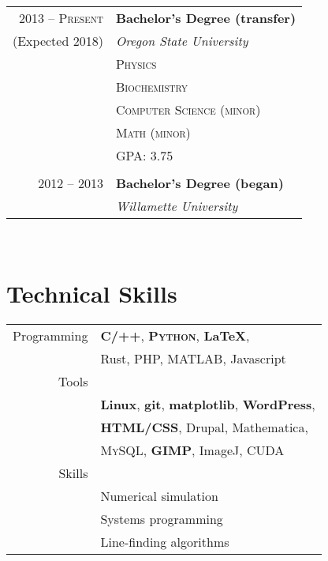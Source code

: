 \documentclass[10pt]{article} %
\begin{document}
{\begin{minipage}[t]{0.44\textwidth}
\begin{tabular}{rl} %


2013 -- \textsc{Present} & \textbf{Bachelor's Degree (transfer)} \\
(Expected 2018)& \textit{Oregon State University}\\
& \textsc{Physics}\\
& \textsc{Biochemistry}\\
& \textsc{Computer Science (minor)}\\
& \textsc{Math (minor)}\\
& GPA: 3.75\\ \\

2012 -- 2013 & \textbf{Bachelor's Degree (began)} \\ 
& \textit{Willamette University}\\
	

\end{tabular}\\[10pt]


\section{Technical Skills} 

\begin{tabular}{rl}
  Programming
  & \textbf{\textsc{C/++}}, \textbf{\textsc{Python}}, \textbf{\LaTeX},\\
  & Rust, PHP, MATLAB, Javascript\\
  Tools\\
  & \textbf{Linux}, \textbf{git}, \textbf{matplotlib}, \textbf{WordPress},\\
  & \textbf{HTML/CSS}, Drupal, Mathematica,\\
  & \textsc{MySQL}, \textbf{GIMP}, ImageJ, CUDA\\
  Skills\\
  &Numerical simulation\\
  &Systems programming\\
  &Line-finding algorithms\\
\end{tabular}\\


\end{minipage}}
\end{document}
